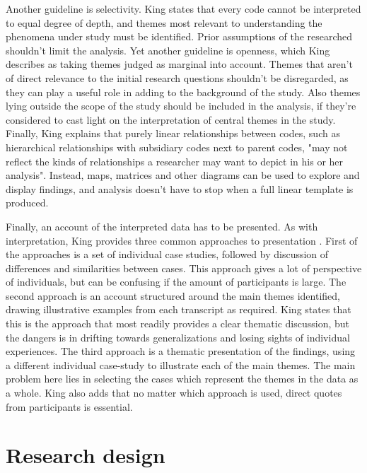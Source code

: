 \documentclass[english]{tktltiki2}
\theoremstyle{definition}
\theoremstyle{remark}
\begin{document}
Another guideline is selectivity. King states that every code cannot be interpreted to equal degree of depth, and themes most relevant to understanding the phenomena under study must be identified. Prior assumptions of the researched shouldn't limit the analysis. Yet another guideline is openness, which King describes as taking themes judged as marginal into account. Themes that aren't of direct relevance to the initial research questions shouldn't be disregarded, as they can play a useful role in adding to the background of the study. Also themes lying outside the scope of the study should be included in the analysis, if they're considered to cast light on the interpretation of central themes in the study. Finally, King explains that purely linear relationships between codes, such as hierarchical relationships with subsidiary codes next to parent codes, "may not reflect the kinds of relationships a researcher may want to depict in his or her analysis". Instead, maps, matrices and other diagrams can be used to explore and display findings, and analysis doesn't have to stop when a full linear template is produced.

Finally, an account of the interpreted data has to be presented. As with interpretation, King provides three common approaches to presentation \cite{king2004using}. First of the approaches is a set of individual case studies, followed by discussion of differences and similarities between cases. This approach gives a lot of perspective of individuals, but can be confusing if the amount of participants is large. The second approach is an account structured around the main themes identified, drawing illustrative examples from each transcript as required. King states that this is the approach that most readily provides a clear thematic discussion, but the dangers is in drifting towards generalizations and losing sights of individual experiences. The third approach is a thematic presentation of the findings, using a different individual case-study to illustrate each of the main themes. The main problem here lies in selecting the cases which represent the themes in the data as a whole. King also adds that no matter which approach is used, direct quotes from participants is essential.  

\section{Research design}
\end{document}
